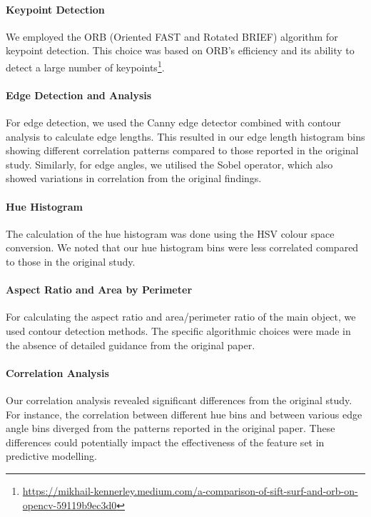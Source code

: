 \paragraph{Keypoint Detection}
We employed the ORB (Oriented FAST and Rotated BRIEF) algorithm\supercite{Rublee2011ORBAE} for keypoint detection. This choice was based on ORB's efficiency and its ability to detect a large number of keypoints\footnote{\url{https://mikhail-kennerley.medium.com/a-comparison-of-sift-surf-and-orb-on-opencv-59119b9ec3d0}}.

\paragraph{Edge Detection and Analysis}
For edge detection, we used the Canny edge detector\supercite{canny1986computational} combined with contour analysis to calculate edge lengths. This resulted in our edge length histogram bins showing different correlation patterns compared to those reported in the original study. Similarly, for edge angles, we utilised the Sobel operator\supercite{kanopoulos1988design}, which also showed variations in correlation from the original findings.

\paragraph{Hue Histogram}
The calculation of the hue histogram was done using the HSV colour space conversion. We noted that our hue histogram bins were less correlated compared to those in the original study.

\paragraph{Aspect Ratio and Area by Perimeter}
For calculating the aspect ratio and area/perimeter ratio of the main object, we used contour detection methods. The specific algorithmic choices were made in the absence of detailed guidance from the original paper.

\paragraph{Correlation Analysis}
Our correlation analysis revealed significant differences from the original study. For instance, the correlation between different hue bins and between various edge angle bins diverged from the patterns reported in the original paper. These differences could potentially impact the effectiveness of the feature set in predictive modelling.

